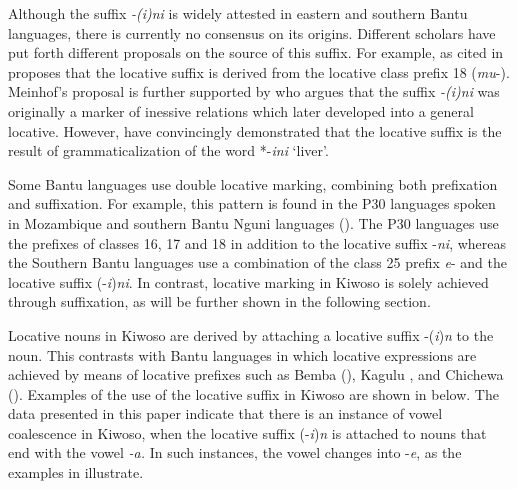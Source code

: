 \documentclass[output=paper]{langscibook}
\begin{document}
Although the suffix \textit{{}-(i)ni} is widely attested in eastern and southern Bantu languages, there is currently no consensus on its origins. Different scholars have put forth different proposals on the source of this suffix. For example, \citet{Meinhof1942} as cited in \citet[128]{SamsonSchadeberg1994} proposes that the locative suffix is derived from the locative class prefix 18 (\textit{mu}{}-). Meinhof’s proposal is further supported by \citet{Güldemann1999} who argues that the suffix \textit{{}-(i)ni} was originally a marker of inessive relations which later developed into a general locative. However, \citet{SamsonSchadeberg1994} have convincingly demonstrated that the locative suffix is the result of grammaticalization of the word *-\textit{ini} ‘liver’.

Some Bantu languages use double locative marking, combining both prefixation and suffixation. For example, this pattern is found in the P30 languages spoken in Mozambique \citep{Guérois2016} and southern Bantu Nguni languages (\citealt{Fleisch2005cognitive, vanderSpuy2014}). The P30 languages use the prefixes of classes 16, 17 and 18 in addition to the locative suffix -\textit{ni}, whereas the Southern Bantu languages use a combination of the class 25 prefix \textit{e}{}- and the locative suffix (-\textit{i})\textit{ni}. In contrast, locative marking in Kiwoso is solely achieved through suffixation, as will be further shown in the following section.

Locative nouns in Kiwoso are derived by attaching a locative suffix -(\textit{i})\textit{n} to the noun. This contrasts with Bantu languages in which locative expressions are achieved by means of locative prefixes such as Bemba (\citealt{Marten2010,Marten2012}), Kagulu \citep{Petzell2008}, and Chichewa (\citealt{BresnanKanerva1989}). Examples of the use of the locative suffix in Kiwoso are shown in  below. The data presented in this paper indicate that there is an instance of vowel coalescence in Kiwoso, when the locative suffix (-\textit{i})\textit{n} is attached to nouns that end with the vowel \textit{{}-a.} In such instances, the vowel changes into -\textit{e}, as the examples in  illustrate. 
\end{document}
